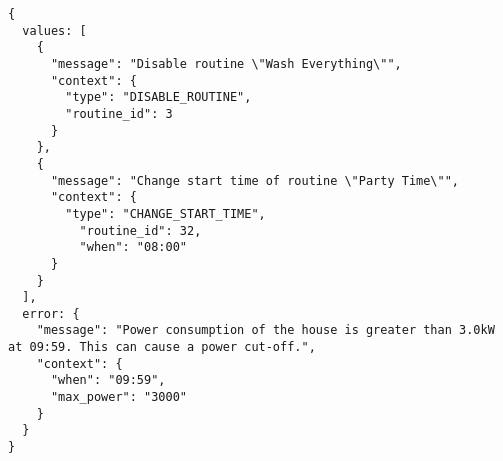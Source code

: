 \begin{lstlisting}[language=numbered,caption={Response to HTTP POST request to the \textit{/simulate} endpoint},label=code:api_response_simulate,float,floatplacement=H]
{
  values: [
    {
      "message": "Disable routine \"Wash Everything\"",
      "context": {
        "type": "DISABLE_ROUTINE",
        "routine_id": 3
      }
    },
    {
      "message": "Change start time of routine \"Party Time\"",
      "context": {
        "type": "CHANGE_START_TIME",
          "routine_id": 32,
          "when": "08:00"
      }
    }
  ],
  error: {
    "message": "Power consumption of the house is greater than 3.0kW at 09:59. This can cause a power cut-off.",
    "context": {
      "when": "09:59",
      "max_power": "3000"
    }
  }
}
\end{lstlisting}
